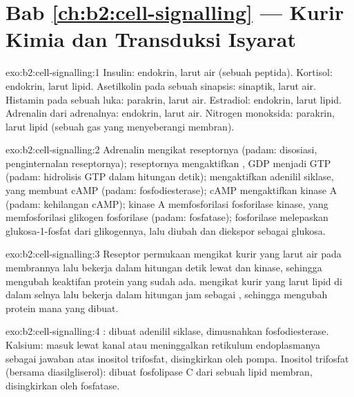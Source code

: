 \section*{Bab \ref{ch:b2:cell-signalling} --- Kurir Kimia dan Transduksi Isyarat}

\begin{solution}{exo:b2:cell-signalling:1}
Insulin: endokrin, larut air (sebuah peptida). Kortisol: endokrin,
larut lipid. Asetilkolin pada sebuah sinapsis: sinaptik, larut air.
Histamin pada sebuah luka: parakrin, larut air. Estradiol: endokrin,
larut lipid. Adrenalin dari adrenalnya: endokrin, larut air. Nitrogen
monoksida: parakrin, larut lipid (sebuah gas yang menyeberangi
membran).
\end{solution}

\begin{solution}{exo:b2:cell-signalling:2}
Adrenalin mengikat reseptornya (padam: disosiasi, penginternalan
reseptornya); reseptornya mengaktifkan , GDP menjadi GTP
(padam: hidrolisis GTP dalam hitungan detik); 
mengaktifkan adenilil siklase, yang membuat cAMP (padam:
fosfodiesterase); cAMP mengaktifkan kinase A (padam: kehilangan cAMP);
kinase A memfosforilasi fosforilase kinase, yang memfosforilasi
glikogen fosforilase (padam: fosfatase); fosforilase melepaskan
glukosa-1-fosfat dari glikogennya, lalu diubah dan diekspor sebagai
glukosa.
\end{solution}

\begin{solution}{exo:b2:cell-signalling:3}
Reseptor permukaan mengikat kurir yang larut air pada membrannya lalu
bekerja dalam hitungan detik lewat  dan kinase, sehingga
mengubah keaktifan protein yang sudah ada.  mengikat kurir
yang larut lipid di dalam selnya lalu bekerja dalam hitungan jam
sebagai , sehingga mengubah protein mana yang dibuat.
\end{solution}

\begin{solution}{exo:b2:cell-signalling:4}
: dibuat adenilil siklase, dimusnahkan fosfodiesterase.
Kalsium: masuk lewat kanal atau meninggalkan retikulum endoplasmanya
sebagai jawaban atas inositol trifosfat, disingkirkan oleh pompa.
Inositol trifosfat (bersama diasilgliserol): dibuat fosfolipase C dari
sebuah lipid membran, disingkirkan oleh fosfatase.
\end{solution}

